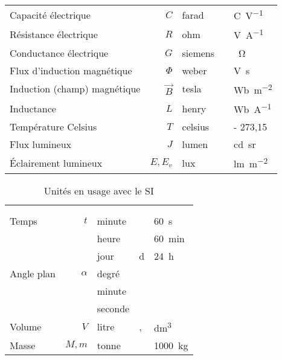 \documentclass[a4paper, 11pt, twoside, fleqn]{memoir}
\begin{document}
\begin{xltabular}{\textwidth}{X r X O}
Capacité électrique							& $C$								& farad				& 	\farad					& \si{\coulomb\per\volt} \\
Résistance électrique							& $R$								& ohm				& 	\ohm						& \si{\volt\per\ampere} \\
Conductance électrique						& $G$								& siemens			&	\siemens				& \si{\per\ohm} \\
Flux d'induction magnétique				& $\Phi$							& weber			&	\weber					& \si{\volt\second} \\
Induction (champ) magnétique			& $\overrightarrow{B}$		& tesla				& \tesla						& \si{\weber\per\square\meter} \\
Inductance										& $L$								& henry				& \henry					& \si{\weber\per\ampere} \\
Température Celsius							& $T$								& celsius			& \celsius					& \kelvin - 273,15 \\
Flux lumineux									& $J$									& lumen			& \lumen					& \si{\candela\steradian} \\
\'Eclairement lumineux						& $E, E_v$							& lux					& \lux						& \si{\lumen\per\square\meter} \\
\end{xltabular}

\begin{table}[!h]
\caption{Unités en usage avec le SI\label{tab:unites_usage_SI}}
\begin{tabularx}{\textwidth}{X r X O}
\toprule
{} &  \\
\cmidrule(lr){1-2} \cmidrule(lr){3-5} 
 &  &  &  \\
\midrule
Temps											& $t$								 	& minute 			& \minute 				& \SI{60}{\second} \\
													& 											& heure				& \hour					& \SI{60}{\minute} \\
													&											&	jour				& \si{\day}			& \SI{24}{\hour} \\
\addlinespace
Angle plan										& $\alpha$							& degré				& \degree				& \times\radian \\
													&											& minute			& \arcminute			& \times\degree \\
													&											& seconde			& \arcsecond			& \times\arcminute \\
\addlinespace
Volume											& $V$									& litre				& \litre, \liter			& \si{\cubic\deci\metre} \\
\addlinespace
Masse											& $M, m$								& tonne				& \tonne				& \SI{1000}{\kilo\gram} \\
\bottomrule
\end{tabularx}
\end{table}
\end{document}
